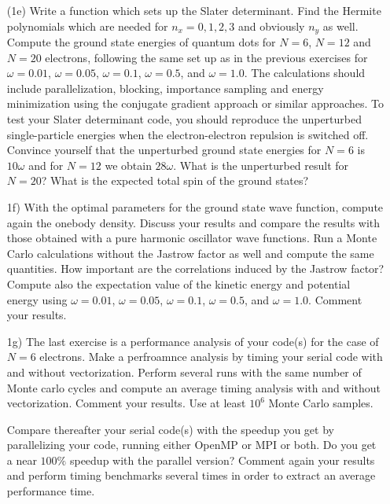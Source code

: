 \documentclass[10pt]{article}
\begin{document}
\begin{enumerate}
\item[(1e)]   Write a function which sets up the Slater determinant. Find the Hermite polynomials which are needed for $n_x=0,1,2,3$ and obviously $n_y$ as well.
Compute the ground state energies of quantum dots for $N=6$, $N=12$ and $N=20$ electrons, following the same set up as in the previous exercises for $\omega=0.01$, $\omega=0.05$,
$\omega=0.1$, $\omega=0.5$, and $\omega=1.0$.
The calculations should include  parallelization, blocking, importance sampling and energy minimization using the conjugate gradient approach or similar approaches.
To test your Slater determinant code, you should reproduce the unperturbed single-particle energies
when the electron-electron repulsion is switched off. Convince yourself that the unperturbed ground state energies for $N=6$ is $10\omega$ and for $N=12$ we obtain $28\omega$.  What is the unperturbed result for $N=20$? What is the expected total 
spin of the ground states?
  
\item[1f)]  With the optimal parameters for the ground state wave function, compute again the onebody density. Discuss your results and compare the results with those obtained with a pure harmonic oscillator  
wave functions. Run a Monte Carlo calculations without the Jastrow factor as well
and compute the same quantities. How important are the correlations induced by the Jastrow factor?
Compute also the expectation value of the kinetic energy and potential energy using $\omega=0.01$,
$\omega=0.05$, $\omega=0.1$, $\omega=0.5$, and $\omega=1.0$. Comment your results.

\item[1g)] The last exercise  is a performance analysis of your code(s) for the case of $N=6$ electrons. Make a perfroamnce analysis by timing your serial code 
with and without vectorization. Perform several runs with the same number of Monte carlo cycles and compute an average timing analysis
with and without vectorization. Comment your results. Use at least $10^6$ Monte Carlo samples. 

Compare thereafter your serial code(s)  with the speedup you get by parallelizing your code, running either OpenMP or MPI or both.
Do you get a near $100\%$ speedup with the parallel version? Comment again your results and perform timing benchmarks several times in order 
to extract  an average performance time. 
\end{enumerate}
\end{document}
